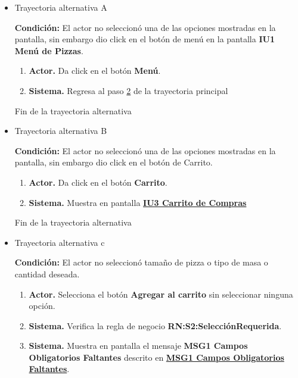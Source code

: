 	\begin{itemize}

		\item \hypertarget{CU1:TAA}{Trayectoria alternativa A}

			\noindent \textbf{Condición:} El actor no seleccionó una de las opciones mostradas en la pantalla, sin embargo dio click en el botón de menú en la pantalla \textbf{IU1 Menú de Pizzas}.
			
			\begin{enumerate}
				\item \textbf{Actor.} Da click en el botón \textbf{Menú}.
				\item \textbf{Sistema.} Regresa al paso \hyperlink{CU1:TP:P2}{2} de la trayectoria principal
			\end{enumerate}
			
			Fin de la trayectoria alternativa
			
			\item \hypertarget{CU1:TAB}{Trayectoria alternativa B}
			
			\noindent \textbf{Condición:} El actor no seleccionó una de las opciones mostradas en la pantalla, sin embargo dio click en el botón de Carrito.
			
			\begin{enumerate}
				\item \textbf{Actor.} Da click en el botón \textbf{Carrito}.
				\item \textbf{Sistema.} Muestra en pantalla \hyperlink{IU3}{\textbf{IU3 Carrito de Compras}}
			\end{enumerate}
			
			Fin de la trayectoria alternativa
			
		\item \hypertarget{CU1:TAC}{Trayectoria alternativa c}
			
			\noindent \textbf{Condición:} El actor no seleccionó tamaño de pizza o tipo de masa o cantidad deseada.
			
			\begin{enumerate}
				\item \textbf{Actor.} Selecciona el botón \textbf{Agregar al carrito} sin seleccionar ninguna opción. 
				
				\item \textbf{Sistema.} Verifica la regla de negocio \textbf{RN:S2:SelecciónRequerida}.
				
				\item \textbf{Sistema.} Muestra en pantalla el mensaje \textbf{MSG1 Campos Obligatorios Faltantes} descrito en \hyperlink{MSG1:CamposObligatorios}{\textbf{MSG1 Campos Obligatorios Faltantes}}. 
				

\end{enumerate}
\end{itemize}

